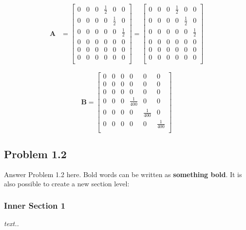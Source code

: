 \begin{equation}
    \begin{aligned}
	\mathbf{A}
	&= 
	\begin{bmatrix}
		0 & 0 & 0 & \frac{1}{2} & 0   & 0\\
		0 & 0 & 0 & 0   & \frac{1}{2} & 0\\
		0 & 0 & 0 & 0   & 0   & \frac{1}{2}\\
		0 & 0 & 0 & 0 & 0 & 0\\
		0 & 0 & 0 & 0 & 0 & 0\\
		0 & 0 & 0 & 0 & 0 & 0\\
	\end{bmatrix}
	=
	\begin{bmatrix}
		0 & 0 & 0 & \frac{1}{2} & 0   & 0\\
		0 & 0 & 0 & 0   & \frac{1}{2} & 0\\
		0 & 0 & 0 & 0   & 0   & \frac{1}{2}\\
		0 & 0 & 0 & 0 & 0 & 0\\
		0 & 0 & 0 & 0 & 0 & 0\\
		0 & 0 & 0 & 0 & 0 & 0\\
	\end{bmatrix}
	\end{aligned}
\end{equation}

\begin{equation}
	\mathbf{B} = 
	\begin{bmatrix}
		0 & 0 & 0 & 0 & 0 & 0\\
		0 & 0 & 0 & 0 & 0 & 0\\
		0 & 0 & 0 & 0 & 0 & 0\\
		0 & 0 & 0 & \frac{1}{400} & 0 & 0\\
		0 & 0 & 0 & 0 & \frac{1}{400} & 0\\
		0 & 0 & 0 & 0 & 0 & \frac{1}{400}\\
	\end{bmatrix}
\end{equation}


\subsection*{Problem 1.2}
Answer Problem 1.2 here. Bold words can be written as \textbf{something bold}. It is also possible to create a new section level:
\subsubsection*{Inner Section 1}
\emph{text..}

